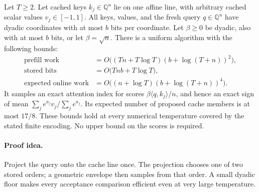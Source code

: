 \begin{theorem}
\label{thm:newrankone}
Let $T\ge2$. Let cached keys $k_j\in\mathbb Q^n$ lie on one
affine line, with arbitrary cached scalar values $v_j\in[-1,1]$.
All keys, values, and the fresh query $q\in\mathbb Q^n$ have dyadic
coordinates with at most $b$ bits per coordinate. Let $\beta\ge0$
be dyadic, also with at most $b$ bits, or let $\beta=\sqrt n$.
There is a uniform algorithm with the following bounds:
\[
 \begin{split}
 \text{prefill work}&=O\bigl((Tn+T\log T)(b+\log(T+n))^2\bigr),\\
 \text{stored bits}&=O\bigl(Tn b+T\log T\bigr),\\
 \text{expected online work}&=
 O\bigl((n+\log T)(b+\log(T+n))^4\bigr).
 \end{split}
\]
It samples an exact attention index for scores
$\beta\langle q,k_j\rangle/n$, and hence an exact sign of mean
$\sum_j e^{a_j}v_j/\sum_j e^{a_j}$.
Its expected number of proposed cache members is at most $17/8$.
These bounds hold at every numerical temperature covered by the
stated finite encoding. No upper bound on the scores is required.
\end{theorem}
\paragraph{Proof idea.}
Project the query onto the cache line once.  The projection chooses one of two stored orders; a geometric envelope then samples from that order.  A small dyadic floor makes every acceptance comparison efficient even at very large temperature.

